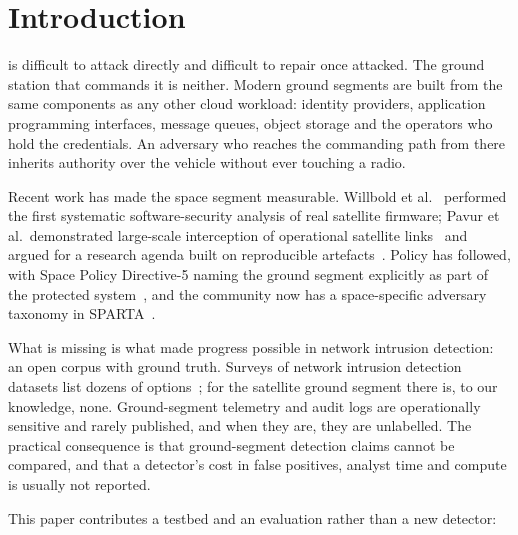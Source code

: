 \documentclass[10pt,journal]{IEEEtran}
\begin{document}
\maketitle
\IEEEdisplaynontitleabstractindextext
\IEEEpeerreviewmaketitle

\section{Introduction}

 is difficult to attack directly and difficult to
repair once attacked. The ground station that commands it is neither. Modern
ground segments are built from the same components as any other cloud workload:
identity providers, application programming interfaces, message queues, object
storage and the operators who hold the credentials. An adversary who reaches the
commanding path from there inherits authority over the vehicle without ever
touching a radio.

Recent work has made the space segment measurable. Willbold et
al.~\cite{willbold2023space} performed the first systematic software-security
analysis of real satellite firmware; Pavur et al.\ demonstrated large-scale
interception of operational satellite links~\cite{pavur2020vsat} and argued for
a research agenda built on reproducible artefacts~\cite{pavur2020sok}. Policy
has followed, with Space Policy Directive-5 naming the ground segment
explicitly as part of the protected system~\cite{spd5}, and the community now
has a space-specific adversary taxonomy in SPARTA~\cite{sparta}.

What is missing is what made progress possible in network intrusion
detection: an open corpus with ground truth. Surveys of network intrusion
detection datasets list dozens of options~\cite{ring2019datasets}; for the
satellite ground segment there is, to our knowledge, none. Ground-segment
telemetry and audit logs are operationally sensitive and rarely published, and
when they are, they are unlabelled. The practical consequence is that
ground-segment detection claims cannot be compared, and that a detector's cost
in false positives, analyst time and compute is usually not reported.

This paper contributes a testbed and an evaluation rather than a new detector:
\end{document}
